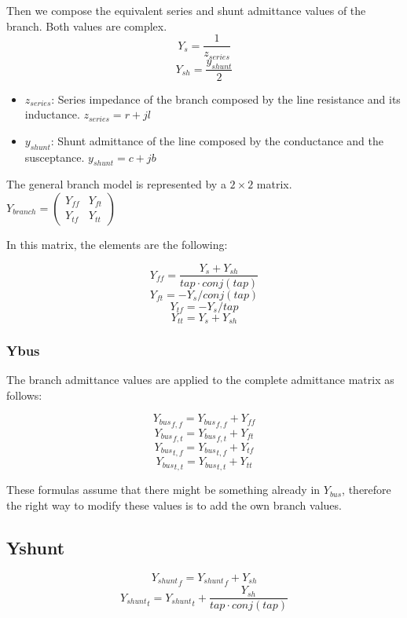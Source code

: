 \documentclass[11pt,fleqn]{book} %
\begin{document}
Then we compose the equivalent series and shunt admittance values of the branch. Both values are complex.
$$Y_s = \frac{1}{z_{series}}$$
$$Y_{sh} = \frac{y_{shunt}}{2}$$

\begin{itemize}
	\item $z_{series}$: Series impedance of the branch composed by the line resistance and its inductance. $z_{series}=r + jl$
	
	\item $y_{shunt}$: Shunt admittance of the line composed by the conductance and the susceptance. $y_{shunt}=c+jb$\newline
\end{itemize}



The general branch model is represented by a $2 \times 2$ matrix.
$
Y_{branch}=\left( \begin{array}{ccc}
Y_{ff} & Y_{ft} \\
Y_{tf} & Y_{tt} \end{array} \right)
$

In this matrix, the elements are the following:


$$Y_{ff} = \frac{Y_s + Y_{sh}}{tap \cdot conj(tap)}  $$
$$Y_{ft} = - Y_s / conj(tap)$$
$$Y_{tf} = - Y_s / tap$$
$$Y_{tt} = Y_s + Y_{sh}$$

\subsubsection{Ybus}

The branch admittance values are applied to the complete admittance matrix as follows:

$${Y_{bus}}_{f, f} = {Y_{bus}}_{f, f}  + Y_{ff}$$
$${Y_{bus}}_{f, t} = {Y_{bus}}_{f, t} + Y_{ft}$$
$${Y_{bus}}_{t, f} = {Y_{bus}}_{t, f} + Y_{tf}$$
$${Y_{bus}}_{t, t} = {Y_{bus}}_{t, t} + Y_{tt}$$


These formulas assume that there might be something already in $Y_{bus}$, therefore the right way to modify these values is to add the own branch values.


\subsection{Yshunt}
$${Y_{shunt}}_f = {Y_{shunt}}_f  + Y_{sh}$$
$${Y_{shunt}}_t = {Y_{shunt}}_t  + \frac{Y_{sh}}{tap \cdot conj(tap)}$$
\end{document}
